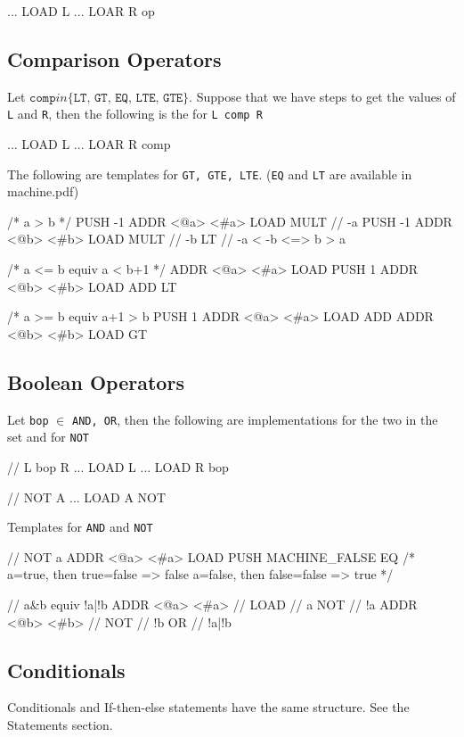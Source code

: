 \begin{code}
...
LOAD L
...
LOAR R
op
\end{code}

\subsection{Comparison Operators}

Let $\texttt{comp} in \{\texttt{LT, GT, EQ, LTE, GTE}\}$. Suppose that we have
steps to get the values of \texttt{L} and \texttt{R}, then the following is the
for \texttt{L comp R}

\begin{code}
...
LOAD L
...
LOAR R
comp
\end{code}


The following are templates for \texttt{GT, GTE, LTE}. (\texttt{EQ} and
\texttt{LT} are available in machine.pdf)


\begin{code}[GT]
/* a > b */
PUSH -1
ADDR <@a> <#a>
LOAD
MULT            // -a
PUSH -1
ADDR <@b> <#b>
LOAD
MULT            // -b
LT              // -a < -b <=> b > a
\end{code}

\begin{code}[LTE]
/* a <= b equiv a < b+1 */
ADDR <@a> <#a>
LOAD
PUSH 1
ADDR <@b> <#b>
LOAD
ADD
LT
\end{code}

\begin{code}[GTE]
/* a >= b equiv a+1 > b
PUSH 1
ADDR <@a> <#a>
LOAD
ADD
ADDR <@b> <#b>
LOAD
GT
\end{code}

\subsection{Boolean Operators}
Let \texttt{bop} $\in$ \texttt{AND, OR}, then the following are implementations
for the two in the set and for \texttt{NOT}

\begin{code}
// L bop R 
...
LOAD L
...
LOAD R
bop

// NOT A
...
LOAD A
NOT
\end{code}

Templates for \texttt{AND} and \texttt{NOT}

\begin{code}[NOT]
// NOT a
ADDR <@a> <#a>
LOAD
PUSH MACHINE_FALSE
EQ 
/* 
  a=true, then true=false => false
  a=false, then false=false => true
*/
\end{code}

\begin{code}[AND]
// a&b equiv !a|!b
ADDR <@a> <#a> // 
LOAD           // a 
NOT            // !a
ADDR <@b> <#b> //
NOT            // !b
OR             // !a|!b
\end{code}
\subsection{Conditionals}
Conditionals and If-then-else statements have the same structure. See the
Statements section.
